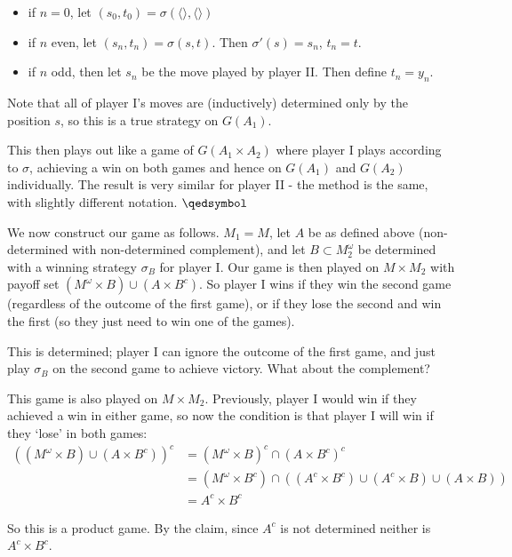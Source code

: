\documentclass[]{article}
\newcommand{\om}{\omega}
\begin{document}
\begin{enumerate}[label = (\arabic*)]
\begin{enumerate}[label = (\alph*)]
        \begin{itemize}
            \item if $n = 0$, let $(s_0,t_0) = \sigma(\langle \rangle, \langle \rangle)$
            \item if $n$ even, let $(s_n,t_n) = \sigma(s,t)$. Then $\sigma'(s) = s_n$, $t_n = t$.
            \item if $n$ odd, then let $s_n$ be the move played by player II. Then define $t_n = y_n$.
        \end{itemize}

        Note that all of player I's moves are (inductively) determined only by the position $s$, so this is a true strategy on $G(A_1)$.

        This then plays out like a game of $G(A_1\times A_2)$ where player I plays according to $\sigma$, achieving a win on both games and hence on $G(A_1)$ and $G(A_2)$ individually. The result is very similar for player II - the method is the same, with slightly different notation. $\qedsymbol$

        We now construct our game as follows. $M_1 = M$, let $A$ be as defined above (non-determined with non-determined complement), and let $B \subset M_2^\om$ be determined with a winning strategy $\sigma_B$ for player I. Our game is then played on $M\times M_2$ with payoff set $(M^\om \times B)\cup (A\times B^c)$. So player I wins if they win the second game (regardless of the outcome of the first game), or if they lose the second and win the first (so they just need to win one of the games).

        This is determined; player I can ignore the outcome of the first game, and just play $\sigma_B$ on the second game to achieve victory. What about the complement?

        This game is also played on $M\times M_2$. Previously, player I would win if they achieved a win in either game, so now the condition is that player I will win if they `lose' in both games:
        \begin{align*}
            ((M^\om\times B)\cup (A\times B^c))^c &= (M^\om \times B)^c \cap (A\times B^c)^c\\
            &= (M^\om \times B^c) \cap ((A^c\times B^c)\cup(A^c\times B)\cup (A\times B))\\
            &=A^c \times B^c
        \end{align*}

        So this is a product game. By the claim, since $A^c$ is not determined neither is $A^c\times B^c$.


\end{enumerate}
\end{enumerate}
\end{document}
